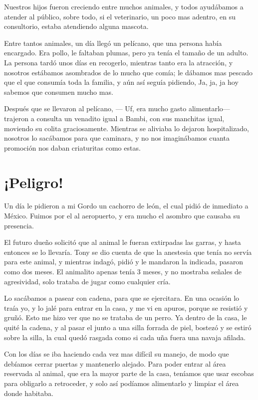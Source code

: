 \documentclass[letterpaper, 12pt]{book}
\begin{document}
Nuestros hijos fueron creciendo entre muchos animales, y todos ayudábamos a atender al público, sobre todo, si el veterinario, un poco mas adentro, en su consultorio, estaba atendiendo alguna mascota.

Entre tantos animales, un día llegó un pelícano, que una persona había encargado. Era pollo, le faltaban plumas, pero ya tenía el tamaño de un adulto.
 La persona tardó unos días en recogerlo, mientras tanto era la atracción, y nosotros estábamos asombrados de lo mucho que comía; le dábamos mas pescado que el que consumía toda la familia, y aún así seguía pidiendo, Ja, ja, ja hoy sabemos que consumen mucho mas.
 
 Después que se llevaron al pelícano, --- Uf, era mucho gasto alimentarlo--- trajeron a consulta un venadito igual a Bambi, con sus manchitas igual, moviendo su colita graciosamente. Mientras se aliviaba lo dejaron hospitalizado, nosotros lo sacábamos para que caminara, y no nos imaginábamos cuanta promoción nos daban criaturitas como estas.
\chapter{¡Peligro!}
Un día le pidieron a mi Gordo un cachorro de león, el cual pidió de inmediato a México. Fuimos por el al aeropuerto, y era mucho el asombro que causaba su presencia.

El futuro dueño solicitó que al animal le fueran extirpadas las garras, y hasta entonces se lo llevaría. Tony se dio cuenta de que la anestesia que tenía no servía para este animal, y mientras indagó, pidió y le mandaron la indicada, pasaron como dos meses. El animalito apenas tenía 3 meses, y no mostraba señales de agresividad, solo trataba de jugar como cualquier cría.

Lo sacábamos a pasear con cadena, para que se ejercitara. En una ocasión lo traía yo, y lo jalé para entrar en la casa, y me vi en apuros, porque se resistió y gruñó. Esto me hizo ver que no se trataba de un perro. Ya dentro de la casa, le quité la cadena, y al pasar el junto a una silla forrada de piel, bostezó y se estiró sobre la silla, la cual quedó rasgada como si cada uña fuera una navaja afilada.

Con los días se iba haciendo cada vez mas difícil su manejo, de modo que debíamos cerrar puertas y mantenerlo alejado. Para poder entrar al área reservada al animal, que era la mayor parte de la casa, teníamos que usar escobas para obligarlo a retroceder, y solo así podíamos alimentarlo y limpiar el área donde habitaba.
\end{document}
